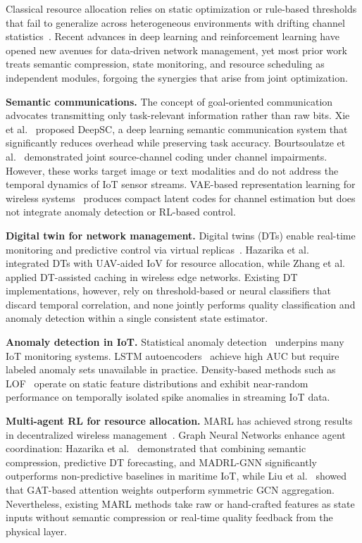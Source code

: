 \documentclass[conference]{IEEEtran}
\begin{document}
Classical resource allocation relies on static optimization or rule-based
thresholds that fail to generalize across heterogeneous environments with
drifting channel statistics~\cite{ref_classical_opt}. Recent advances in
deep learning and reinforcement learning have opened new avenues for
data-driven network management, yet most prior work treats semantic
compression, state monitoring, and resource scheduling as independent
modules, forgoing the synergies that arise from joint optimization.

\textbf{Semantic communications.}
The concept of goal-oriented communication~\cite{ref_sem_comm} advocates
transmitting only task-relevant information rather than raw bits. Xie
et al.~\cite{ref_deepsc} proposed DeepSC, a deep learning semantic
communication system that significantly reduces overhead while preserving
task accuracy. Bourtsoulatze et al.~\cite{ref_jscc} demonstrated joint
source-channel coding under channel impairments. However, these works
target image or text modalities and do not address the temporal dynamics
of IoT sensor streams. VAE-based representation learning for wireless
systems~\cite{ref_vae_wireless} produces compact latent codes for channel
estimation but does not integrate anomaly detection or RL-based control.

\textbf{Digital twin for network management.}
Digital twins (DTs) enable real-time monitoring and predictive control via
virtual replicas~\cite{ref_dt_survey}. Hazarika et al.~\cite{ref_dt_uav}
integrated DTs with UAV-aided IoV for resource allocation, while
Zhang et al.~\cite{ref_dt_edge} applied DT-assisted caching in wireless
edge networks. Existing DT implementations, however, rely on
threshold-based or neural classifiers that discard temporal correlation,
and none jointly performs quality classification and anomaly detection
within a single consistent state estimator.

\textbf{Anomaly detection in IoT.}
Statistical anomaly detection~\cite{ref_anomaly_survey} underpins many
IoT monitoring systems. LSTM autoencoders~\cite{ref_anomaly_dl} achieve
high AUC but require labeled anomaly sets unavailable in practice.
Density-based methods such as LOF~\cite{ref_lof} operate on static feature
distributions and exhibit near-random performance on temporally isolated
spike anomalies in streaming IoT data.

\textbf{Multi-agent RL for resource allocation.}
MARL has achieved strong results in decentralized wireless
management~\cite{ref_marl_wireless}. Graph Neural Networks enhance
agent coordination: Hazarika et al.~\cite{ref_semadt} demonstrated that
combining semantic compression, predictive DT forecasting, and MADRL-GNN
significantly outperforms non-predictive baselines in maritime IoT, while
Liu et al.~\cite{ref_gat_comm} showed that GAT-based attention weights
outperform symmetric GCN aggregation. Nevertheless, existing MARL methods
take raw or hand-crafted features as state inputs without semantic
compression or real-time quality feedback from the physical layer.
\end{document}
